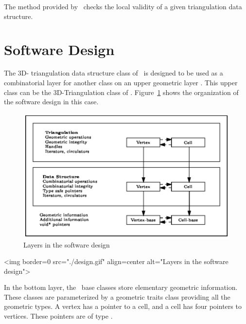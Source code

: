 The  method provided by \cgal\ checks the local
validity of a given triangulation data structure.
 
\section{Software Design}
\label{TDS3-sec-design}

The 3D- triangulation data structure class of \cgal\ is designed to be
used as a combinatorial layer for another class on an upper geometric
layer \cite{k-ddsps-98}. This upper class can be the 3D-Triangulation class of
\cgal. Figure~\ref{TDS3-fig-layers} shows the organization of the
software design in this case.

\begin{ccTexOnly}
\begin{figure}[htbp]

\begin{center} 
\includegraphics{design.eps} 
\end{center}
\caption{Layers in the software design\label{TDS3-fig-layers}} 
\end{figure} 
\end{ccTexOnly}

\begin{ccHtmlOnly}
<img border=0 src="./design.gif" align=center alt="Layers in the software design">
\end{ccHtmlOnly}

In the bottom layer, the \cgal\ base classes store elementary
geometric information.  These classes are parameterized by a geometric
traits class providing all the geometric types. A vertex has a pointer
to a cell, and a cell has four pointers to vertices. These pointers
are of type .


